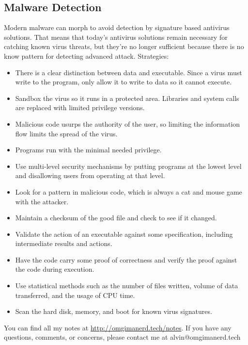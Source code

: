 \documentclass{math}
\begin{document}
\subsection*{Malware Detection}
Modern malware can morph to avoid detection by signature based antivirus
solutions. That means that today's antivirus solutions remain necessary for
catching known virus threats, but they're no longer sufficient because there is
no know pattern for detecting advanced attack. Strategies:
\begin{itemize}
  \item There is a clear distinction between data and executable. Since a virus
    must write to the program, only allow it to write to data so it cannot
    execute.
  \item Sandbox the virus so it runs in a protected area. Libraries and system
    calls are replaced with limited privilege versions.
  \item Malicious code usurps the authority of the user, so limiting the
    information flow limits the spread of the virus.
  \item Programs run with the minimal needed privilege.
  \item Use multi-level security mechanisms by putting programs at the lowest
    level and disallowing users from operating at that level.
  \item Look for a pattern in malicious code, which is always a cat and mouse
    game with the attacker.
  \item Maintain a checksum of the good file and check to see if it changed.
  \item Validate the action of an executable against some specification,
    including intermediate results and actions.
  \item Have the code carry some proof of correctness and verify the proof
    against the code during execution.
  \item Use statistical methods such as the number of files written, volume of
    data transferred, and the usage of CPU time.
  \item Scan the hard disk, memory, and boot for known virus signatures.
\end{itemize}

\begin{center}
  You can find all my notes at \url{http://omgimanerd.tech/notes}. If you have
  any questions, comments, or concerns, please contact me at
  alvin@omgimanerd.tech
\end{center}
\end{document}

